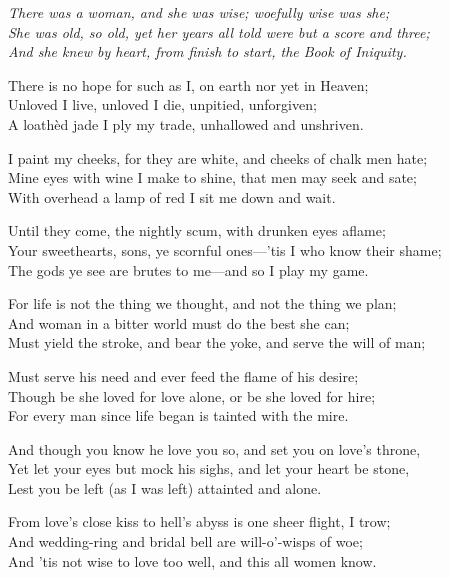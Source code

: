 

\begin{poemblock}
\textit{
There was a woman, and she was wise; woefully wise was she;\\
She was old, so old, yet her years all told were but a score and three;\\
And she knew by heart, from finish to start, the Book of Iniquity.
}

There is no hope for such as I, on earth nor yet in Heaven;\\
Unloved I live, unloved I die, unpitied, unforgiven;\\
A loathèd jade I ply my trade, unhallowed and unshriven.

I paint my cheeks, for they are white, and cheeks of chalk men hate;\\
Mine eyes with wine I make to shine, that men may seek and sate;\\
With overhead a lamp of red I sit me down and wait.

Until they come, the nightly scum, with drunken eyes aflame;\\
Your sweethearts, sons, ye scornful ones—'tis I who know their shame;\\
The gods ye see are brutes to me—and so I play my game.

For life is not the thing we thought, and not the thing we plan;\\
And woman in a bitter world must do the best she can;\\
Must yield the stroke, and bear the yoke, and serve the will of man;

Must serve his need and ever feed the flame of his desire;\\
Though be she loved for love alone, or be she loved for hire;\\
For every man since life began is tainted with the mire.

And though you know he love you so, and set you on love's throne,\\
Yet let your eyes but mock his sighs, and let your heart be stone,\\
Lest you be left (as I was left) attainted and alone.

From love's close kiss to hell's abyss is one sheer flight, I trow;\\
And wedding-ring and bridal bell are will-o'-wisps of woe;\\
And 'tis not wise to love too well, and this all women know.


\end{poemblock}

